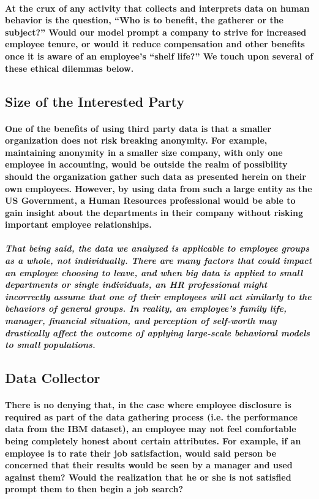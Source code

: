 \documentclass{article}
\begin{document}
\paragraph{At the crux of any activity that collects and interprets data on human behavior is the question, “Who is to benefit, the gatherer or the subject?” Would our model prompt a company to strive for increased employee tenure, or would it reduce compensation and other benefits once it is aware of an employee’s “shelf life?” We touch upon several of these ethical dilemmas below.}
 
\subsection{Size of the Interested Party}

\paragraph{One of the benefits of using third party data is that a smaller organization does not risk breaking anonymity. For example, maintaining anonymity in a smaller size company, with only one employee in accounting, would be outside the realm of possibility should the organization gather such data as presented herein on their own employees. However, by using data from such a large entity as the US Government, a Human Resources professional would be able to gain insight about the departments in their company without risking important employee relationships.}
 
\subparagraph{That being said, the data we analyzed is applicable to employee groups as a whole, not individually. There are many factors that could impact an employee choosing to leave, and when big data is applied to small departments or single individuals, an HR professional might incorrectly assume that one of their employees will act similarly to the behaviors of general groups. In reality, an employee’s family life, manager, financial situation, and perception of self-worth may drastically affect the outcome of applying large-scale behavioral models to small populations.}
 
\subsection{Data Collector}

\paragraph{There is no denying that, in the case where employee disclosure is required as part of the data gathering process (i.e. the performance data from the IBM dataset), an employee may not feel comfortable being completely honest about certain attributes. For example, if an employee is to rate their job satisfaction, would said person be concerned that their results would be seen by a manager and used against them? Would the realization that he or she is not satisfied prompt them to then begin a job search?}
 
\end{document}
